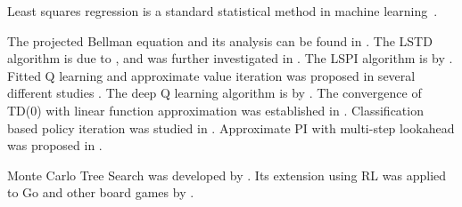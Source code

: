Least squares regression is a standard statistical method in machine learning~\citep{mohri2018foundations,shalev2014understanding}.

The projected Bellman equation and its analysis can be found in \citep{Bertsekas05}.
The LSTD algorithm is due to \cite{bradtke1996linear}, and was further investigated in \cite{boyan2002technical}. The LSPI algorithm is by \citep{lagoudakis2003least}. Fitted Q learning and approximate value iteration was proposed in several different studies \citep{gordon1995stable, tsitsiklis1996feature, riedmiller2005neural, ormoneit2002kernel, ernst2005approximate}. The deep Q learning algorithm is by \citep{mnih2015human}.
The convergence of TD(0) with linear function approximation was established in \citep{tsitsiklis1996analysis}.
Classification based policy iteration was studied in \cite{lagoudakis2003reinforcement,lazaric2010analysis,scherrer2015approximate}. Approximate PI with multi-step lookahead was proposed in \citep{efroni2018beyond}. 

Monte Carlo Tree Search was developed by \citep{coulom2006efficient,kocsis2006bandit}. Its extension using RL was applied to Go and other board games by \citep{silver2016mastering,silver2018general}.